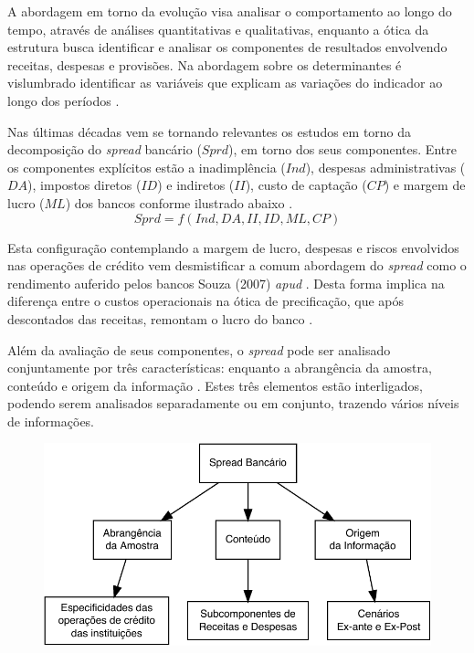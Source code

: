 \documentclass[12pt,12pt,openright,oneside,a4paper,chapter=TITLE,section=TITLE,subsection=TITLE,subsubsection=TITLE,english,french,spanish,portugues,sumario=tradicional]{abntex2}
\begin{document}
A abordagem em torno da evolução visa analisar o comportamento ao longo do
tempo, através de análises quantitativas e qualitativas, enquanto a ótica da
estrutura busca identificar e analisar os componentes de resultados envolvendo
receitas, despesas e provisões. Na abordagem sobre os determinantes é
vislumbrado identificar as variáveis que explicam as variações do indicador ao
longo dos períodos \cite{dick:1999}.

Nas últimas décadas vem se tornando relevantes os estudos em torno da decomposição do \emph{spread} bancário (\(Sprd\)), em torno dos seus componentes. Entre os componentes explícitos estão a inadimplência (\(Ind\)), despesas administrativas (\(DA\)), impostos diretos (\(ID\)) e indiretos (\(II\)), custo de captação (\(CP\)) e margem de lucro (\(ML\)) dos bancos conforme ilustrado abaixo \cite{BCB:2000}.
\[
Sprd=f(Ind, DA, II, ID, ML, CP)
\]

Esta configuração contemplando a margem de lucro, despesas e riscos envolvidos nas operações de crédito vem desmistificar a comum abordagem do \emph{spread} como o rendimento auferido pelos bancos \cite{costa;nakane:2004} Souza (2007) \emph{apud} \cite{dantas:2012}. Desta forma implica na diferença entre o custos operacionais na ótica de precificação, que após descontados das receitas, remontam o lucro do banco \cite{BCB:2016}.

Além da avaliação de seus componentes, o \emph{spread} pode ser analisado
conjuntamente por três características: enquanto a abrangência da amostra,
conteúdo e origem da informação \cite{leal:2006}. Estes três elementos estão interligados, podendo serem analisados separadamente ou em conjunto, trazendo vários níveis de informações.

\begin{figure}

\begin{center}\includegraphics{12-exportedfigures/diagram.spread.carac-1} \end{center}
\label{fig:diagramb}
\end{figure}
\end{document}
